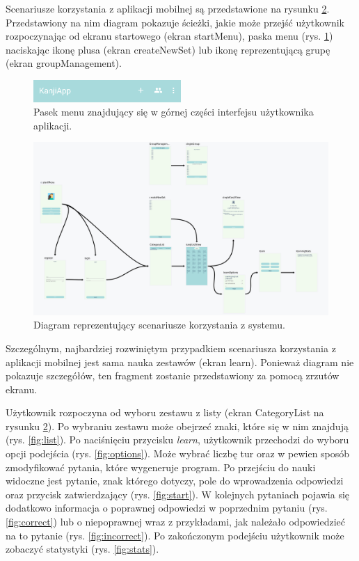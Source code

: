 \documentclass[a4paper,twoside,12pt]{book}
\begin{document}
Scenariusze korzystania z aplikacji mobilnej są przedstawione na rysunku \ref{fig:navgraph}. Przedstawiony na nim diagram pokazuje ścieżki, jakie może przejść użytkownik rozpoczynając od ekranu startowego (ekran startMenu), paska menu (rys. \ref{fig:menu}) naciskając ikonę plusa (ekran createNewSet) lub ikonę reprezentującą grupę (ekran groupManagement). 

\begin{figure}[]
\centering
\includegraphics[width=0.5\textwidth]{menu}
\caption{Pasek menu znajdujący się w górnej części interfejsu użytkownika aplikacji.}
\label{fig:menu}
\end{figure}

\begin{figure}[]
\centering
\includegraphics[width=\textwidth]{Navgraph}
\caption{Diagram reprezentujący scenariusze korzystania z systemu.}
\label{fig:navgraph}
\end{figure}

Szczególnym, najbardziej rozwiniętym przypadkiem scenariusza korzystania z aplikacji mobilnej jest sama nauka zestawów (ekran learn). Ponieważ diagram nie pokazuje szczegółów, ten fragment zostanie przedstawiony za pomocą zrzutów ekranu. 

Użytkownik rozpoczyna od wyboru zestawu z listy (ekran CategoryList na rysunku \ref{fig:navgraph}). Po wybraniu zestawu może obejrzeć znaki, które się w nim znajdują (rys. \ref{fig:list}). Po naciśnięciu przycisku \textit{learn}, użytkownik przechodzi do wyboru opcji podejścia (rys. \ref{fig:options}). Może wybrać liczbę tur oraz w pewien sposób zmodyfikować pytania, które wygeneruje program.  Po przejściu do nauki widoczne jest pytanie, znak którego dotyczy, pole do wprowadzenia odpowiedzi oraz przycisk zatwierdzający (rys. \ref{fig:start}). W kolejnych pytaniach pojawia się dodatkowo informacja o poprawnej odpowiedzi w poprzednim pytaniu (rys. \ref{fig:correct}) lub o niepoprawnej wraz z przykładami, jak należało odpowiedzieć na to pytanie (rys. \ref{fig:incorrect}). Po zakończonym podejściu użytkownik może zobaczyć statystyki (rys. \ref{fig:stats}).
\end{document}
